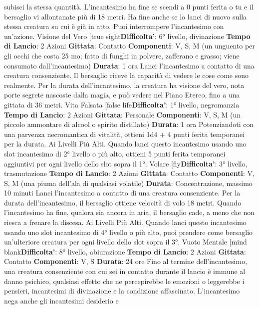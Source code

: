 \begin{multicols}{2}
subisci la stessa quantità.
L’incantesimo ha fine se scendi a 0 punti ferita o tu e il
bersaglio vi allontanate più di 18 metri. Ha fine anche
se lo lanci di nuovo sulla stessa creatura su cui è già in
atto. Puoi interrompere l’incantesimo con un’azione.
Visione del Vero
[true sight\textbf{Difficolta'}:
6° livello, divinazione
\textbf{Tempo di Lancio}: 2 Azioni
\textbf{Gittata}: Contatto
\textbf{Componenti}: V, S, M (un unguento per gli occhi che
costa 25 mo; fatto di funghi in polvere, zafferano e
grasso; viene consumato dall’incantesimo)
\textbf{Durata}: 1 ora
Lanci l’incantesimo a contatto di una creatura
consenziente. Il bersaglio riceve la capacità di vedere le
cose come sono realmente. Per la durata
dell’incantesimo, la creatura ha visione del vero, nota
porte segrete nascoste dalla magia, e può vedere nel
Piano Etereo, fino a una gittata di 36 metri.
Vita Falsata
[false life\textbf{Difficolta'}:
1° livello, negromanzia
\textbf{Tempo di Lancio}: 2 Azioni
\textbf{Gittata}: Personale
\textbf{Componenti}: V, S, M (un piccolo ammontare di alcool
o spirito distillato)
\textbf{Durata}: 1 ora
Potenziandoti con una parvenza necromantica di
vitalità, ottieni 1d4 + 4 punti ferita temporanei per la
durata.
Ai Livelli Più Alti. Quando lanci questo incantesimo
usando uno slot incantesimo di 2° livello o più alto,
ottieni 5 punti ferita temporanei aggiuntivi per ogni
livello dello slot sopra il 1°.
Volare
[fly\textbf{Difficolta'}:
3° livello, trasmutazione
\textbf{Tempo di Lancio}: 2 Azioni
\textbf{Gittata}: Contatto
\textbf{Componenti}: V, S, M (una piuma dell’ala di qualsiasi
volatile)
\textbf{Durata}: Concentrazione, massimo 10 minuti
Lanci l’incantesimo a contatto di una creatura
consenziente. Per la durata dell’incantesimo, il
bersaglio ottiene velocità di volo 18 metri. Quando
l’incantesimo ha fine, qualora sia ancora in aria, il
bersaglio cade, a meno che non riesca a frenare la
discesa.
Ai Livelli Più Alti. Quando lanci questo incantesimo
usando uno slot incantesimo di 4° livello o più alto, puoi
prendere come bersaglio un’ulteriore creatura per ogni
livello dello slot sopra il 3°.
Vuoto Mentale
[mind blank\textbf{Difficolta'}:
8° livello, abiurazione
\textbf{Tempo di Lancio}: 2 Azioni
\textbf{Gittata}: Contatto
\textbf{Componenti}: V, S
\textbf{Durata}: 24 ore
Fino al termine dell’incantesimo, una creatura
consenziente con cui sei in contatto durante il lancio è
immune al danno psichico, qualsiasi effetto che ne
percepirebbe le emozioni o leggerebbe i pensieri,
incantesimi di divinazione e la condizione affascinato.
L’incantesimo nega anche gli incantesimi desiderio e

\end{multicols}
